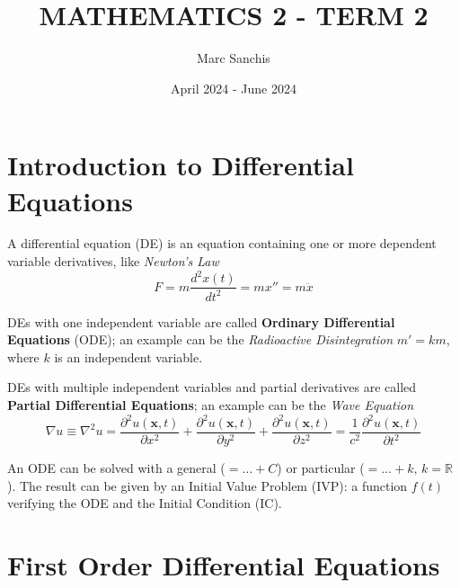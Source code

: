 \documentclass[a4paper]{article}
\title{MATHEMATICS 2 - TERM 2}
\author{Marc Sanchis}
\date{April 2024 - June 2024}
\begin{document}
\maketitle

\renewcommand{\contentsname}{}
\tableofcontents

\newpage
\restoregeometry
\pagestyle{fancy}
\setcounter{section}{5}

\section{Introduction to Differential Equations}

A differential equation (DE) is an equation containing one or more dependent variable derivatives, like \textit{Newton's Law}
$$
F=m \frac{d^{2}x(t)}{dt^{2}}=mx''=m\ddot{x}
$$

DEs with one independent variable are called \textbf{Ordinary Differential Equations} (ODE); an example can be the \textit{Radioactive Disintegration} $m'=km$, where $k$ is an independent variable.

DEs with multiple independent variables and partial derivatives are called \textbf{Partial Differential Equations}; an example can be the \textit{Wave Equation}
$$
\nabla u\equiv\nabla^{2}u=\frac{\partial^{2}u(\mathbf{x}, t)}{\partial x^{2}}+\frac{\partial^{2}u(\mathbf{x},t)}{\partial y^{2}}+\frac{\partial^{2}u(\mathbf{x},t)}{\partial z^{2}}=\frac{1}{c^{2}}\frac{\partial^{2}u(\mathbf{x},t)}{\partial t^{2}}
$$

\vspace{1ex}\vspace{1ex}

An ODE can be solved with a general ($=\dots+C$) or particular ($=\dots+k,\,k=\mathbb{R}$). The result can be given by an Initial Value Problem (IVP): a function $f(t)$ verifying the ODE and the Initial Condition (IC).

\vspace{1ex}\vspace{1ex}

\section{First Order Differential Equations}
\end{document}
